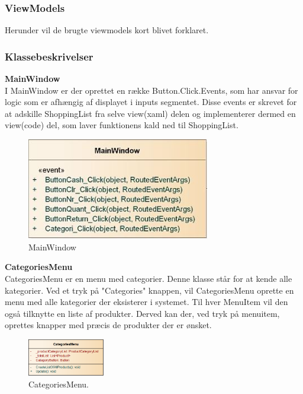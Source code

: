 \subsubsection{ViewModels}
Herunder vil de brugte viewmodels kort blivet forklaret.

\subsubsection{Klassebeskrivelser}
\textbf{MainWindow}\\
I MainWindow er der oprettet en række Button.Click.Events, som har ansvar for logic som er afhængig af displayet i inputs segmentet. Disse events er skrevet for at adskille ShoppingList fra selve view(xaml) delen og implementerer dermed en view(code) del, som laver funktionens kald ned til ShoppingList. 

\begin{figure}[H]
	\centering
	\includegraphics[width=80mm]{Systemdesign/Frontend/GUI/Pics/Main}
	\caption{MainWindow}
	\label{fig:KasseMainWindowClass}
\end{figure}

\textbf{CategoriesMenu}\\
CategoriesMenu er en menu med categorier. Denne klasse står for at kende alle kategorier. Ved et tryk på "Categories" knappen, vil CategoriesMenu oprette en menu med alle kategorier der eksisterer i systemet. Til hver MenuItem vil den også tilknytte en liste af produkter. Derved kan der, ved tryk på menuitem, oprettes knapper med præcis de produkter der er ønsket. 

\begin{figure}[H]
	\centering
	\includegraphics[width=0.3\textwidth]{Systemdesign/Frontend/pics/CategoriesMenu}
	\caption{CategoriesMenu.}
	\label{fig:PBC}
\end{figure}

